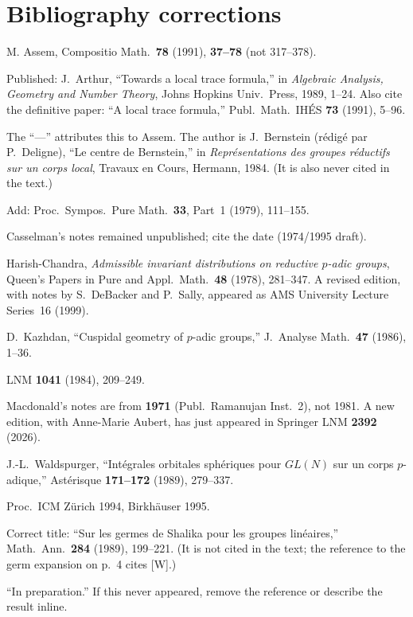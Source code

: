 \documentclass[11pt]{article}
\begin{document}
\section{Bibliography corrections}
\begin{description}[leftmargin=1.2em,style=nextline]
\item[{[A]}] M. Assem, Compositio Math.\ \textbf{78} (1991), \textbf{37--78} (not 317--378).
\item[{[Art1]}] Published: J.~Arthur, ``Towards a local trace formula,'' in \emph{Algebraic Analysis, Geometry and Number Theory}, Johns Hopkins Univ.\ Press, 1989, 1--24. Also cite the definitive paper: ``A local trace formula,'' Publ.\ Math.\ IH\'ES \textbf{73} (1991), 5--96.
\item[{[BD]}] The ``---'' attributes this to Assem. The author is J.~Bernstein (r\'edig\'e par P.~Deligne), ``Le centre de Bernstein,'' in \emph{Repr\'esentations des groupes r\'eductifs sur un corps local}, Travaux en Cours, Hermann, 1984. (It is also never cited in the text.)
\item[{[Car]}] Add: Proc.\ Sympos.\ Pure Math.\ \textbf{33}, Part~1 (1979), 111--155.
\item[{[Cas2]}] Casselman's notes remained unpublished; cite the date (1974/1995 draft).
\item[{[HC]}] Harish-Chandra, \emph{Admissible invariant distributions on reductive $p$-adic groups}, Queen's Papers in Pure and Appl.\ Math.\ \textbf{48} (1978), 281--347. A revised edition, with notes by S.~DeBacker and P.~Sally, appeared as AMS University Lecture Series~16 (1999).
\item[{[K]}] D.~Kazhdan, ``Cuspidal geometry of $p$-adic groups,'' J.\ Analyse Math.\ \textbf{47} (1986), 1--36.
\item[{[Kaz]}] LNM \textbf{1041} (1984), 209--249.
\item[{[M]}] Macdonald's notes are from \textbf{1971} (Publ.\ Ramanujan Inst.\ 2), not 1981. A new edition, with Anne-Marie Aubert, has just appeared in Springer LNM \textbf{2392} (2026).
\item[{[W]}] J.-L.~Waldspurger, ``Int\'egrales orbitales sph\'eriques pour $GL(N)$ sur un corps $p$-adique,'' Ast\'erisque \textbf{171--172} (1989), 279--337.
\item[{[Wa]}] Proc.\ ICM Z\"urich 1994, Birkh\"auser 1995.
\item[{[Wald]}] Correct title: ``Sur les germes de Shalika pour les groupes lin\'eaires,'' Math.\ Ann.\ \textbf{284} (1989), 199--221. (It is not cited in the text; the reference to the germ expansion on p.~4 cites [W].)
\item[{[J]}] ``In preparation.'' If this never appeared, remove the reference or describe the result inline.
\end{description}
\end{document}
